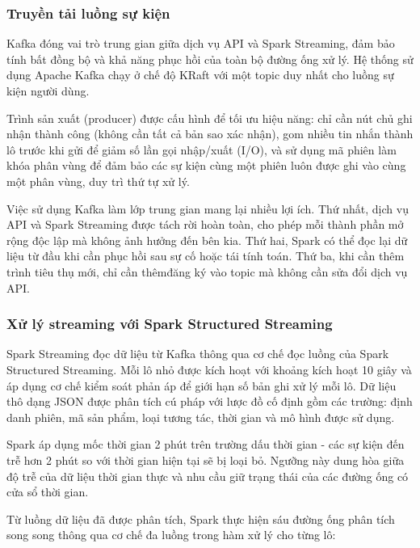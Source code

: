 \documentclass[../BTL.tex]{subfiles}
\begin{document}
\subsubsection{Truyền tải luồng sự kiện}
Kafka đóng vai trò trung gian giữa dịch vụ API và Spark Streaming, đảm bảo tính bất đồng bộ và khả năng phục hồi của toàn bộ đường ống xử lý. Hệ thống sử dụng Apache Kafka chạy ở chế độ KRaft với một topic duy nhất cho luồng sự kiện người dùng.

Trình sản xuất (producer) được cấu hình để tối ưu hiệu năng: chỉ cần nút chủ ghi nhận thành công (không cần tất cả bản sao xác nhận), gom nhiều tin nhắn thành lô trước khi gửi để giảm số lần gọi nhập/xuất (I/O), và sử dụng mã phiên làm khóa phân vùng để đảm bảo các sự kiện cùng một phiên luôn được ghi vào cùng một phân vùng, duy trì thứ tự xử lý.

Việc sử dụng Kafka làm lớp trung gian mang lại nhiều lợi ích. Thứ nhất, dịch vụ API và Spark Streaming được tách rời hoàn toàn, cho phép mỗi thành phần mở rộng độc lập mà không ảnh hưởng đến bên kia. Thứ hai, Spark có thể đọc lại dữ liệu từ đầu khi cần phục hồi sau sự cố hoặc tái tính toán. Thứ ba, khi cần thêm trình tiêu thụ mới, chỉ cần thêmđăng ký vào topic mà không cần sửa đổi dịch vụ API.

\subsubsection{Xử lý streaming với Spark Structured Streaming}
Spark Streaming đọc dữ liệu từ Kafka thông qua cơ chế đọc luồng của Spark Structured Streaming. Mỗi lô nhỏ được kích hoạt với khoảng kích hoạt 10 giây và áp dụng cơ chế kiểm soát phản áp để giới hạn số bản ghi xử lý mỗi lô. Dữ liệu thô dạng JSON được phân tích cú pháp với lược đồ cố định gồm các trường: định danh phiên, mã sản phẩm, loại tương tác, thời gian và mô hình được sử dụng.

Spark áp dụng mốc thời gian 2 phút trên trường dấu thời gian - các sự kiện đến trễ hơn 2 phút so với thời gian hiện tại sẽ bị loại bỏ. Ngưỡng này dung hòa giữa độ trễ của dữ liệu thời gian thực và nhu cầu giữ trạng thái của các đường ống có cửa sổ thời gian.

Từ luồng dữ liệu đã được phân tích, Spark thực hiện sáu đường ống phân tích song song thông qua cơ chế đa luồng trong hàm xử lý cho từng lô:
\end{document}
